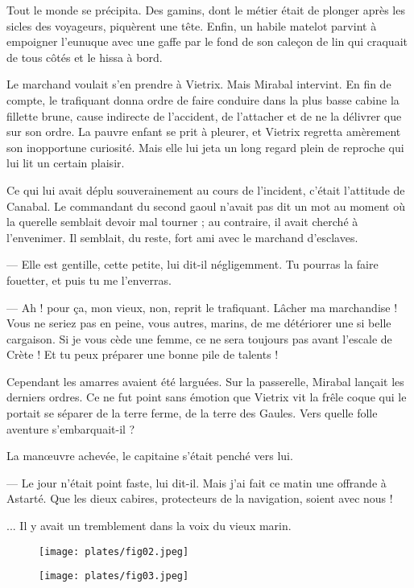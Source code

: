 \documentclass[a4paper, 11pt, oneside, polutonikogreek, french]{article}
\begin{document}
Tout le monde se précipita. Des gamins, dont le métier était de plonger après les sicles des voyageurs, piquèrent une tête. Enfin, un habile matelot parvint à empoigner l'eunuque avec une gaffe par le fond de son caleçon de lin qui craquait de tous côtés et le hissa à bord.

Le marchand voulait s'en prendre à Vietrix. Mais Mirabal intervint. En fin de compte, le trafiquant donna ordre de faire conduire dans la plus basse cabine la fillette brune, cause indirecte de l'accident, de l'attacher et de ne la délivrer que sur son ordre. La pauvre enfant se prit à pleurer, et Vietrix regretta amèrement son inopportune curiosité. Mais elle lui jeta un long regard plein de reproche qui lui lit un certain plaisir.

Ce qui lui avait déplu souverainement au cours de l'incident, c'était l'attitude de Canabal. Le commandant du second gaoul n'avait pas dit un mot au moment où la querelle semblait devoir mal tourner ; au contraire, il avait cherché à l'envenimer. Il semblait, du reste, fort ami avec le marchand d'esclaves.

--- Elle est gentille, cette petite, lui dit-il négligemment. Tu pourras la faire fouetter, et puis tu me l'enverras.

--- Ah ! pour ça, mon vieux, non, reprit le trafiquant. Lâcher ma marchandise ! Vous ne seriez pas en peine, vous autres, marins, de me détériorer une si belle cargaison. Si je vous cède une femme, ce ne sera toujours pas avant l'escale de Crète ! Et tu peux préparer une bonne pile de talents !

\bigskip
\centerline{\EightStarTaper}
\centerline{\EightStarTaper\EightStarTaper}
\bigskip

Cependant les amarres avaient été larguées. Sur la passerelle, Mirabal lançait les derniers ordres. Ce ne fut point sans émotion que Vietrix vit la frêle coque qui le portait se séparer de la terre ferme, de la terre des Gaules. Vers quelle folle aventure s'embarquait-il ?

La manœuvre achevée, le capitaine s'était penché vers lui.

--- Le jour n'était point faste, lui dit-il. Mais j'ai fait ce matin une offrande à Astarté. Que les dieux cabires, protecteurs de la navigation, soient avec nous !

... Il y avait un tremblement dans la voix du vieux marin.

\begin{figure}[H]
\centering
\texttt{[image: plates/fig02.jpeg]}
\end{figure}
\clearpage
\begin{figure}[H]
\centering
\texttt{[image: plates/fig03.jpeg]}
\end{figure}
\end{document}
